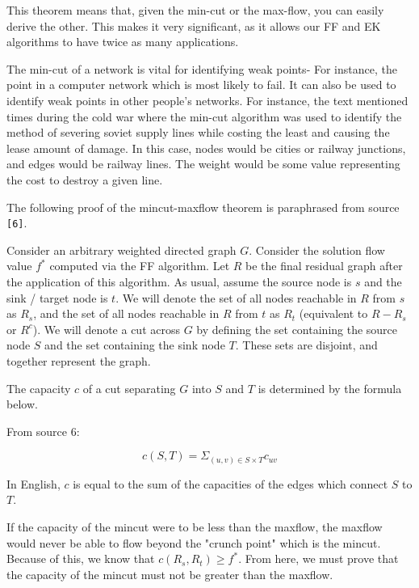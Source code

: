 \documentclass[12pt]{amsart}
\begin{document}
    This theorem means that, given the min-cut or the max-flow,
    you can easily derive the other. This makes it very
    significant, as it allows our FF and EK algorithms to have
    twice as many applications.

    The min-cut of a network is vital for identifying weak
    points- For instance, the point in a computer network which
    is most likely to fail. It can also be used to identify weak
    points in other people's networks. For instance, the text
    mentioned times during the cold war where the min-cut
    algorithm was used to identify the method of severing soviet
    supply lines while costing the least and causing the lease
    amount of damage. In this case, nodes would be cities or
    railway junctions, and edges would be railway lines. The
    weight would be some value representing the cost to destroy
    a given line.

    The following proof of the mincut-maxflow theorem is
    paraphrased from source \verb|[6]|.

    Consider an arbitrary weighted directed graph $G$. Consider
    the solution flow value $f^*$ computed via the FF algorithm.
    Let $R$ be the final residual graph after the application of
    this algorithm. As usual, assume the source node is $s$ and
    the sink / target node is $t$. We will denote the set of all
    nodes reachable in $R$ from $s$ as $R_s$, and the set of all
    nodes reachable in $R$ from $t$ as $R_t$ (equivalent to
    $R - R_s$ or $R^c$). We will denote a cut across $G$ by
    defining the set containing the source node $S$ and the set
    containing the sink node $T$. These sets are disjoint, and
    together represent the graph.

    The capacity $c$ of a cut separating $G$ into $S$ and $T$ is
    determined by the formula below.

    \begin{center}
    From source 6:
    \end{center}
    
    \[
        c(S, T) = \Sigma_{ \left( u, v \right) \in S \times T }
            c_{uv}
    \]

    In English, $c$ is equal to the sum of the capacities of the
    edges which connect $S$ to $T$.

    If the capacity of the mincut were to be less than the
    maxflow, the maxflow would never be able to flow beyond the
    "crunch point" which is the mincut. Because of this, we know
    that $c(R_s, R_t) \ge f^*$. From here, we must prove that
    the capacity of the mincut must not be greater than the
    maxflow.
\end{document}

